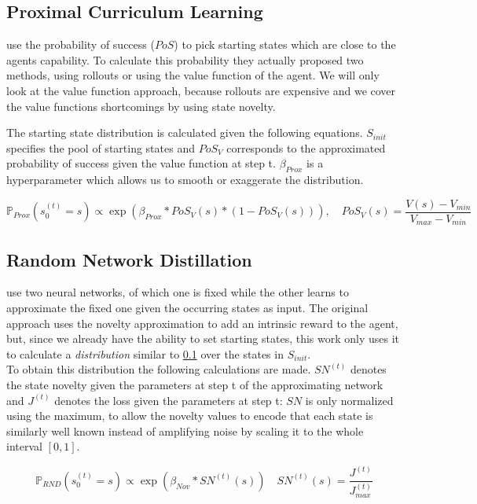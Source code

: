 \documentclass{article}
\begin{document}
\subsection{Proximal Curriculum Learning}
\label{sec:prox_detail}
\cite{prox_curr} use the probability of success ($PoS$) to pick starting states which are close to the agents capability.
To calculate this probability they actually proposed two methods, using rollouts or using the value function of the agent. We will only look at the value function approach, because rollouts are expensive and we cover the value functions shortcomings by using state novelty.

The starting state distribution is calculated given the following equations. $S_{init}$ specifies the pool of starting states and $PoS_V$ corresponds to the approximated probability of success given the value function at step t. $\beta_{Prox}$ is a hyperparameter which allows us to smooth or exaggerate the distribution.

\begin{equation}\label{dist:prox_curr}
  \mathbb{P}_{Prox}(s_0^{(t)} = s) \propto \exp(\beta_{Prox} * PoS_V(s) * (1 - PoS_V(s))), \quad PoS_V(s) = \frac{V(s) - V_{min}}{V_{max} - V_{min}}
\end{equation}



\subsection{Random Network Distillation}
\label{sec:rnd}
\cite{rnd} use two neural networks, of which one is fixed while the other learns to approximate the fixed one given the occurring states as input.
The original approach uses the novelty approximation to add an intrinsic reward to the agent, but, since we already have the ability to set starting states, this work only uses it to calculate a \textit{distribution} similar to \cref{sec:prox_detail} over the states in $S_{init}$. \\
To obtain this distribution the following calculations are made. $SN^{(t)}$ denotes the state novelty given the parameters at step t of the approximating network and $J^{(t)}$ denotes the loss given the parameters at step t:
$SN$ is only normalized using the maximum, to allow the novelty values to encode that each state is similarly well known instead of amplifying noise by scaling it to the whole interval $[0, 1]$.

\begin{equation}\label{dist:rnd}
  \mathbb{P}_{RND}(s_0^{(t)} = s) \propto \exp(\beta_{Nov} * SN^{(t)}(s)) \quad SN^{(t)}(s) = \frac{J^{(t)}}{J_{max}^{(t)}}
\end{equation}
\end{document}
